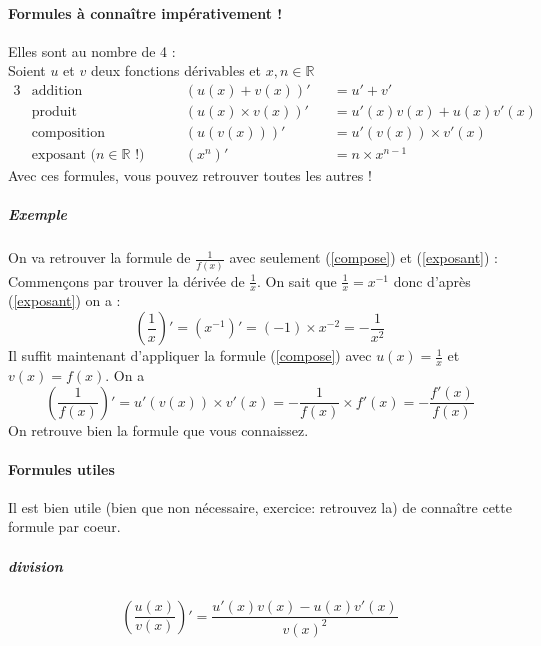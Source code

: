 \documentclass[11pt]{article}
\newcommand{\R}{\mathbb R}
\newcommand{\de}[1]{\left(#1\right)'}
\begin{document}
        \paragraph{Formules à connaître impérativement !}
        Elles sont au nombre de 4 : \\Soient $u$ et $v$ deux fonctions dérivables et $x,n \in  \R $
        \begin{alignat}{3} 
            &\text{addition} &\qquad& (u(x) + v(x))'&& = u'+v' \label{addition} \\
            &\text{produit} && (u(x) \times v(x))'&& = u'(x)v(x) + u(x)v'(x) \label{produit}\\
            &\text{composition} && (u(v(x)))'&& = u'(v(x)) \times v'(x) \label{compose}\\
            &\text{exposant ($n\in \R$ !)} && (x^n)'&& = n \times x^{n-1} \label{exposant}
        \end{alignat}
        Avec ces formules, vous pouvez retrouver toutes les autres !
        \subparagraph{Exemple} On va retrouver la formule de $\frac{1}{f(x)}$ avec seulement (\ref{compose}) et (\ref{exposant}) :\\
            Commençons par trouver la dérivée de $\frac{1}{x}$.
            On sait que $\frac{1}{x}=x^{-1}$ donc d'après (\ref{exposant}) on a :
                \begin{equation*}
                    \de{\frac{1}{x}}=\de{x^{-1}}=(-1)\times x^{-2} = -\frac{1}{x^2}
                \end{equation*}
            Il suffit maintenant d'appliquer la formule (\ref{compose}) avec $u(x)=\frac{1}{x}$ et $v(x)=f(x)$. On a 
                \begin{equation*}
                    \de{\frac{1}{f(x)}}=u'(v(x))\times v'(x)=-\frac{1}{f(x)}\times f'(x)=-\frac{f'(x)}{f(x)}
                \end{equation*}
            On retrouve bien la formule que vous connaissez.
        \paragraph{Formules utiles}
        Il est bien utile (bien que non nécessaire, exercice: retrouvez la) de connaître cette formule par coeur.
        \subparagraph{division}
        \begin{equation*}
            \de{\frac{u(x)}{v(x)}} = \frac{u'(x)v(x) - u(x)v'(x)}{v(x)^2}
        \end{equation*}
\end{document}
